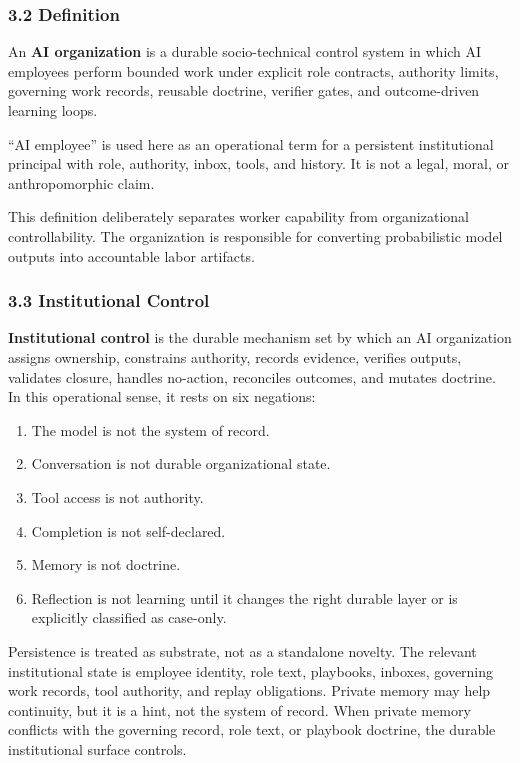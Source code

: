 \documentclass[
]{article}
\providecommand{\tightlist}{%
  \setlength{\itemsep}{0pt}\setlength{\parskip}{0pt}}
\begin{document}
\subsubsection{3.2 Definition}\label{definition}

An \textbf{AI organization} is a durable socio-technical control system in which AI employees perform bounded work under explicit role contracts, authority limits, governing work records, reusable doctrine, verifier gates, and outcome-driven learning loops.

``AI employee'' is used here as an operational term for a persistent institutional principal with role, authority, inbox, tools, and history. It is not a legal, moral, or anthropomorphic claim.

This definition deliberately separates worker capability from organizational controllability. The organization is responsible for converting probabilistic model outputs into accountable labor artifacts.

\subsubsection{3.3 Institutional Control}\label{institutional-control}

\textbf{Institutional control} is the durable mechanism set by which an AI organization assigns ownership, constrains authority, records evidence, verifies outputs, validates closure, handles no-action, reconciles outcomes, and mutates doctrine. In this operational sense, it rests on six negations:

\begin{enumerate}
\def\labelenumi{\arabic{enumi}.}
\tightlist
\item
  The model is not the system of record.
\item
  Conversation is not durable organizational state.
\item
  Tool access is not authority.
\item
  Completion is not self-declared.
\item
  Memory is not doctrine.
\item
  Reflection is not learning until it changes the right durable layer or is explicitly classified as case-only.
\end{enumerate}

Persistence is treated as substrate, not as a standalone novelty. The relevant institutional state is employee identity, role text, playbooks, inboxes, governing work records, tool authority, and replay obligations. Private memory may help continuity, but it is a hint, not the system of record. When private memory conflicts with the governing record, role text, or playbook doctrine, the durable institutional surface controls.
\end{document}
